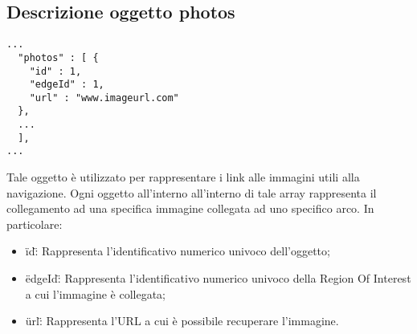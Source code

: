 \documentclass[../ManualeSviluppatore.tex]{subfiles}
\begin{document}
	\subsection{Descrizione oggetto photos}
		\begin{lstlisting}
...
  "photos" : [ {
    "id" : 1,
    "edgeId" : 1,
    "url" : "www.imageurl.com"
  },  
  ...
  ],
...
		\end{lstlisting}
		Tale oggetto è utilizzato per rappresentare i link alle immagini utili alla navigazione. Ogni oggetto all'interno all'interno di tale array rappresenta il collegamento ad una specifica immagine collegata ad uno specifico arco. In particolare:
		\begin{itemize}
			\item \"id\": Rappresenta l'identificativo numerico univoco dell'oggetto;
			\item \"edgeId\": Rappresenta l'identificativo numerico univoco della Region Of Interest a cui l'immagine è collegata;
			\item \"url\": Rappresenta l'URL a cui è possibile recuperare l'immagine.
		\end{itemize}
\end{document}
